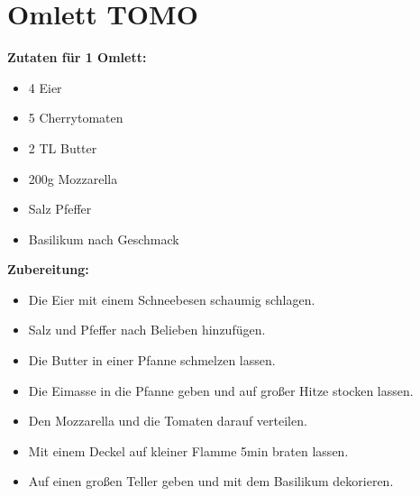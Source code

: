 \section{Omlett TOMO}

\textbf{Zutaten für 1 Omlett:}
\begin{itemize}
  \item 4 Eier
  \item 5 Cherrytomaten
  \item 2 TL Butter
  \item 200g Mozzarella
  \item Salz Pfeffer
  \item Basilikum nach Geschmack
\end{itemize}

\textbf{Zubereitung:}
\begin{itemize}
  \item Die Eier mit einem Schneebesen schaumig schlagen.
  \item Salz und Pfeffer nach Belieben hinzufügen.
  \item Die Butter in einer Pfanne schmelzen lassen.
  \item Die Eimasse in die Pfanne geben und auf großer Hitze stocken lassen.
  \item Den Mozzarella und die Tomaten darauf verteilen.
  \item Mit einem Deckel auf kleiner Flamme 5min braten lassen.
  \item Auf einen großen Teller geben und mit dem Basilikum dekorieren.
\end{itemize}
